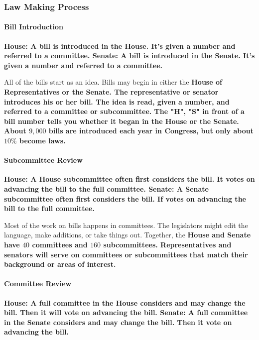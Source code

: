 \subsubsection*{Law Making Process}

\paragraph{Bill Introduction}

\bf{House}: A bill is introduced in the \bf{House}. It's given a number and referred to a committee.
\bf{Senate}: A bill is introduced in the \bf{Senate}. It's given a number and referred to a committee.

All of the bills start as an idea. Bills may begin in either the \bf{House of Representatives} or the \bf{Senate}. The representative or senator introduces his or her bill. The idea is read, given a number, and referred to a committee or subcommittee. The \bf{"H", "S"} in front of a bill number tells you whether it began in the \bf{House} or the \bf{Senate}. About $9,000$ bills are introduced each year in Congress, but only about $10\%$ become laws.

\paragraph{Subcommittee Review}

\bf{House}: A \bf{House} subcommittee often first considers the bill. It votes on advancing the bill to the full committee.
\bf{Senate}: A \bf{Senate} subcommittee often first considers the bill. If votes on advancing the bill to the full committee.

Most of the work on bills happens in committees. The legislators might edit the language, make additions, or take things out. Together, the \bf{House} and \bf{Senate} have $40$ committees and $160$ subcommittees. Representatives and senators will serve on committees or subcommittees that match their background or areas of interest.

\paragraph{Committee Review}

\bf{House}: A full committee in the \bf{House} considers and may change the bill. Then it will vote on advancing the bill.
\bf{Senate}: A full committee in the \bf{Senate} considers and may change the bill. Then it vote on advancing the bill.

